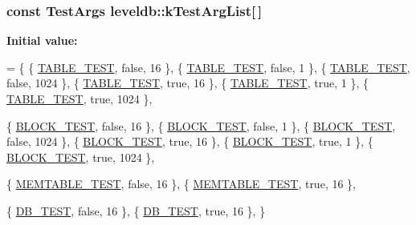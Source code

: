 \subsubsection[{k\+Test\+Arg\+List}]{\setlength{\rightskip}{0pt plus 5cm}const {\bf Test\+Args} leveldb\+::k\+Test\+Arg\+List\mbox{[}$\,$\mbox{]}\hspace{0.3cm}{\ttfamily [static]}}\label{namespaceleveldb_a6d7e1fb11fbc0e83ef27e87007c8a425}
{\bfseries Initial value\+:}
\begin{DoxyCode}
= \{
  \{ \hyperlink{namespaceleveldb_aefcb8349b9101fe6eeff98a1682f1342afcbbb26886c91919805d694a85d7a7d0}{TABLE\_TEST}, \textcolor{keyword}{false}, 16 \},
  \{ \hyperlink{namespaceleveldb_aefcb8349b9101fe6eeff98a1682f1342afcbbb26886c91919805d694a85d7a7d0}{TABLE\_TEST}, \textcolor{keyword}{false}, 1 \},
  \{ \hyperlink{namespaceleveldb_aefcb8349b9101fe6eeff98a1682f1342afcbbb26886c91919805d694a85d7a7d0}{TABLE\_TEST}, \textcolor{keyword}{false}, 1024 \},
  \{ \hyperlink{namespaceleveldb_aefcb8349b9101fe6eeff98a1682f1342afcbbb26886c91919805d694a85d7a7d0}{TABLE\_TEST}, \textcolor{keyword}{true}, 16 \},
  \{ \hyperlink{namespaceleveldb_aefcb8349b9101fe6eeff98a1682f1342afcbbb26886c91919805d694a85d7a7d0}{TABLE\_TEST}, \textcolor{keyword}{true}, 1 \},
  \{ \hyperlink{namespaceleveldb_aefcb8349b9101fe6eeff98a1682f1342afcbbb26886c91919805d694a85d7a7d0}{TABLE\_TEST}, \textcolor{keyword}{true}, 1024 \},

  \{ \hyperlink{namespaceleveldb_aefcb8349b9101fe6eeff98a1682f1342aa6bc1b815c870f47c3c0288ab56ce3c9}{BLOCK\_TEST}, \textcolor{keyword}{false}, 16 \},
  \{ \hyperlink{namespaceleveldb_aefcb8349b9101fe6eeff98a1682f1342aa6bc1b815c870f47c3c0288ab56ce3c9}{BLOCK\_TEST}, \textcolor{keyword}{false}, 1 \},
  \{ \hyperlink{namespaceleveldb_aefcb8349b9101fe6eeff98a1682f1342aa6bc1b815c870f47c3c0288ab56ce3c9}{BLOCK\_TEST}, \textcolor{keyword}{false}, 1024 \},
  \{ \hyperlink{namespaceleveldb_aefcb8349b9101fe6eeff98a1682f1342aa6bc1b815c870f47c3c0288ab56ce3c9}{BLOCK\_TEST}, \textcolor{keyword}{true}, 16 \},
  \{ \hyperlink{namespaceleveldb_aefcb8349b9101fe6eeff98a1682f1342aa6bc1b815c870f47c3c0288ab56ce3c9}{BLOCK\_TEST}, \textcolor{keyword}{true}, 1 \},
  \{ \hyperlink{namespaceleveldb_aefcb8349b9101fe6eeff98a1682f1342aa6bc1b815c870f47c3c0288ab56ce3c9}{BLOCK\_TEST}, \textcolor{keyword}{true}, 1024 \},

  
  \{ \hyperlink{namespaceleveldb_aefcb8349b9101fe6eeff98a1682f1342a86f848bd8f163c760b4c661bdec7d46b}{MEMTABLE\_TEST}, \textcolor{keyword}{false}, 16 \},
  \{ \hyperlink{namespaceleveldb_aefcb8349b9101fe6eeff98a1682f1342a86f848bd8f163c760b4c661bdec7d46b}{MEMTABLE\_TEST}, \textcolor{keyword}{true}, 16 \},

  
  \{ \hyperlink{namespaceleveldb_aefcb8349b9101fe6eeff98a1682f1342aa533718fc4477e8662fb49275ff8c908}{DB\_TEST}, \textcolor{keyword}{false}, 16 \},
  \{ \hyperlink{namespaceleveldb_aefcb8349b9101fe6eeff98a1682f1342aa533718fc4477e8662fb49275ff8c908}{DB\_TEST}, \textcolor{keyword}{true}, 16 \},
\}
\end{DoxyCode}
\hypertarget{namespaceleveldb_a193cc831a2200dd1c5e6aee70d6654d3}{}
